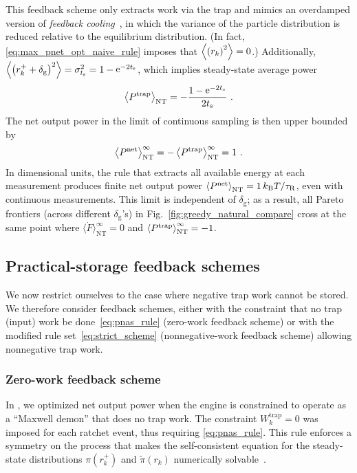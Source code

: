 \documentclass[%
reprint,
bibnotes, amsmath, amssymb, aps, pre,
 showkeys,
floatfix
]{revtex4-2}
\newcommand{\kT}{k_{\mathrm{B}}T}
\newcommand{\mrm}{\mathrm}
\newcommand{\pr}[1]{\left(#1\right)} %
\newcommand{\trelo}{\tau_{\mrm{R}}}
\newcommand{\dg}{\delta_{\mrm{g}}}
\newcommand{\ts}{t_{\mrm{s}}}
\newcommand{\xkr}{r_{k}}
\newcommand{\xkpr}{r_{k}^{+}}
\newcommand{\wt}{W^{\mrm{trap}}}
\newcommand{\ept}{\ev{P^{\mrm{trap}}}}
\newcommand{\epg}{\langle\dot{F}\rangle}
\newcommand{\epn}{\ev{P^{\mrm{net}}}}
\DeclareMathOperator{\e}{e}
\begin{document}
This feedback scheme only extracts work via the trap and mimics an overdamped version of \emph{feedback cooling}~\cite{Kim2007,Horowitz2014}, in which the variance of the particle distribution is reduced relative to the equilibrium distribution. 
(In fact, \eqref{eq:max_pnet_opt_naive_rule} imposes that $\ev{\pr{\xkr}^{2}} = 0$.)
Additionally, $\ev{\pr{\xkpr + \dg}^{2}} = \sigma_{\ts}^{2} = 1-\e^{-2\ts}$, which implies steady-state average power 
\begin{align}
    \ept_{\mrm{NT}} = -\frac{1-\e^{-2\ts}}{2\ts}\ . \label{eq:m2_fdt_expr}
\end{align}
The net output power in the limit of continuous sampling is then upper bounded by
\begin{align}
    \epn_{\mrm{NT}}^{\infty} = -\ept_{\mrm{NT}}^{\infty} = 1\ . \label{eq:pnet_bound} 
\end{align}
In dimensional units, the rule that extracts all available energy at each measurement produces finite net output power $\epn_{\mrm{NT}} = 1\, \kT/\trelo$, even with continuous measurements.
This limit is independent of $\dg$; as a result, all Pareto frontiers (across different $\dg$'s) in Fig.~\ref{fig:greedy_natural_compare} cross at the same point where $\epg_{\mrm{NT}}^{\infty}=0$ and $\ept_{\mrm{NT}}^{\infty} = -1$.


\subsection{Practical-storage feedback schemes}
\label{subsec:practical_storage_schemes}

We now restrict ourselves to the case where negative trap work cannot be stored.
We therefore consider feedback schemes, either with the constraint that no trap (input) work be done~\eqref{eq:pnas_rule} (zero-work feedback scheme) or with the 
modified rule set~\eqref{eq:strict_scheme} (nonnegative-work feedback scheme) allowing nonnegative trap work. 


\subsubsection{Zero-work feedback scheme}
\label{subsubsec:maxwell_demon_feedback_scheme}

In \cite{Saha2021}, we optimized net output power when the engine is constrained to operate as a ``Maxwell demon'' that does no trap work.
The constraint $\wt_k = 0$ was imposed for each ratchet event, thus requiring \eqref{eq:pnas_rule}.
This rule enforces a symmetry on the process that makes the self-consistent equation for the steady-state distributions $\pi\pr{\xkpr}$ and $\tilde{\pi}\pr{\xkr}$ numerically solvable~\cite[SI App. E]{Saha2021}. 
\end{document}
